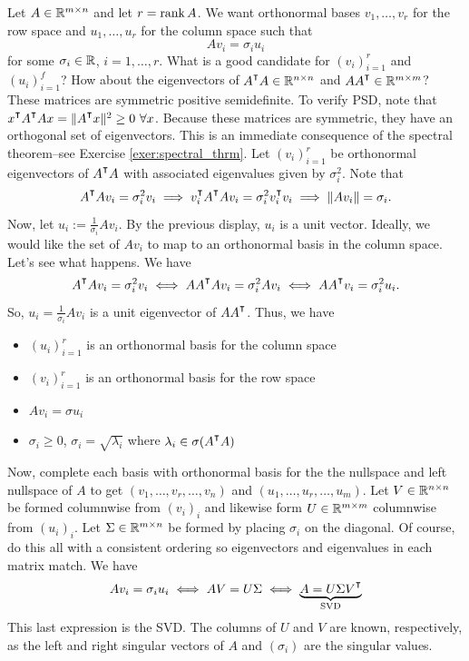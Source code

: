 Let $A\in \mathbb{R}^{m\times n}$ and let $r = \textup{rank}\,{A}$. We want orthonormal bases $v_1,\ldots, v_r$  for the row space and $u_1,\ldots,u_r$ for the column space such that
$$
A v_i = \sigma_i u_i
$$
for some $\sigma_i \in \mathbb{R}$, $i=1,\ldots, r$. 
What is a good candidate for $(v_i)_{i=1}^r$ and $(u_i)_{i=1}^f$? How about the eigenvectors of  $A^\T A \in \R^{n\times n}$ and $AA^\T\in \R^{m\times m}$? These matrices are symmetric positive semidefinite. To verify PSD, note that $x^\T A^\T A x = \|A^\T x\|^2 \geq 0 ~ \forall x$. Because these matrices are symmetric, they have an orthogonal set of eigenvectors. This is an immediate consequence of the spectral theorem--see Exercise \ref{exer:spectral_thrm}. Let $(v_i)_{i=1}^r$ be orthonormal eigenvectors of $A^\T A$ with associated eigenvalues given by $\sigma_i^2$. Note that
$$
A^\T Av_i = \sigma_i^2 v_i \implies  v_i^\T A^\T A v_i = \sigma_i^2 v_i^\T v_i \implies \|A v_i\| = \sigma_i.
$$
Now, let $u_i := \frac{1}{\sigma_i}Av_i$. By the previous display, $u_i$ is a unit vector. Ideally, we would like the set of $Av_i$ to map to an orthonormal basis in the column space. Let's see what happens. We have
$$
A^\T A v_i = \sigma_i^2 v_i \iff AA^\T Av_i = \sigma_i^2 A v_i \iff A A^\T v_i = \sigma_i^2 u_i. 
$$
So, $u_i = \frac{1}{\sigma_i} A v_i$ is a unit eigenvector of $A A^\T$. Thus, we have
\begin{itemize}
  \item $(u_i)_{i=1}^r$ is an orthonormal basis for the column space
  \item $(v_i)_{i=1}^r$ is an orthonormal basis for the row space
  \item $Av_i = \sigma u_i$
  \item $\sigma_i \geq 0$, $\sigma_i = \sqrt{\lambda_i}$ where $\lambda_i \in \sigma(A^\T A)$
\end{itemize}
Now, complete each basis with orthonormal basis for the the nullspace and left nullspace of $A$ to get $(v_1,\ldots,v_r,\ldots, v_n)$ and $(u_1,\ldots, u_r, \ldots, u_m)$. Let $V\in \mathbb{R}^{n\times n}$ be formed columnwise from $(v_i)_i$ and likewise form $U\in \mathbb{R}^{m\times m}$ columnwise from $(u_i)_i$. Let $\Sigma \in \mathbb{R}^{m\times n}$ be formed by placing $\sigma_i$ on the diagonal. Of course, do this all with a consistent ordering so eigenvectors and eigenvalues in each matrix match. We have
$$
A v_i = \sigma_i u_i \iff AV = U\Sigma \iff \underbrace{A =  U \Sigma V^\T}_{\text{SVD}}
$$
This last expression is the SVD. The columns of $U$ and $V$ are known, respectively, as the left and right singular vectors of $A$ and $(\sigma_i)$ are the singular values. 

